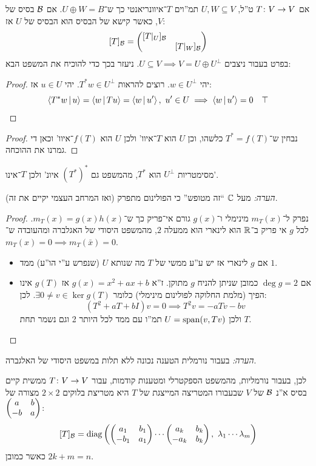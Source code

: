 \documentclass[]{../../../../tex/classes/styledArticle}
\begin{document}
	אם $T \colon V \to V$ ט''ל, $U, W \subseteq V$ תמ''וים $T$־איוונריאנטי כך ש־$U \oplus W = B$. אם $\mathcal{B}$ בסיס של $V$, כאשר קישא של הבסיס הוא הבסיס של $U$ אז: 
	\[ [T]_{\mathcal{B}} = \begin{pmatrix} [T|_U]_{\mathcal{B}} &  \\  & [T|_W]_{\mathcal{B}} \end{pmatrix} \]
	בפרט בעבור ניצבים $U \subseteq V \implies V = U \oplus U^{\perp}$. ניעזר בכך כדי להוכיח את המשפט הבא: 
	\begin{proof}
		יהי $w \in U^{\perp}$. רוצים להראות $T^*w \in U^{\perp}$. יהי $u \in U$ אז: 
		\[ \left \langle T^* w \,\middle|\, u \right \rangle = \left \langle w \,\middle|\, Tu \right \rangle = \left \langle w \,\middle|\, u' \right \rangle, \ u' \in U \implies \left \langle w \,\middle|\, u' \right \rangle = 0 \quad \top \]
	\end{proof}
	\begin{proof}
		נבחין ש־$T^* = f(T)$ כלשהו, וכן $U$ הוא $T$־איוו' ולכן $U$ הוא $f(T)$־איוו' וכאן די גמרנו את ההוכחה. 
	\end{proof}
	מסימטריות $U^{\perp}$ הוא $T^*$, מהמשפט גם $(T^*)^*$ איונ' ולכן $T$־אינו'. 
	
	\textit{הערה: }מעל $\mathbb{C}$ ``זה מטופש'' כי הפולינום מתפרק (ואז המרחב העצמי יקיים את זה). 
	\begin{proof}
		נפרק ל־$m_T(x)$ מינימלי ו־$g(x)$ גורם אי־פריק כך ש־$m_T(x) = g(x)h(x)$. לכל $g$ אי פריק ב־$\mathbb{R}$ הוא לינארי  הוא ממעלה $2$, מהמשפט היסודי של האגלברה ומהעובדה ש־$m_T(x) = 0 \implies m_T(\bar x) = 0$. 
		\begin{itemize}
			\item אם $g$ לינארי אז יש ע''ע ממשי של $T$ מה שנותא $U$ (שנפרש ע''י הו''ע) ממד $1$. 
			\item אם $\deg g = 2$ כמובן שניתן להניח $g$ מתוקן. ז''א $g(x) = x^2 + ax + b$ אז $g(T)$ אינו הפיך (מלמת החלוקה לפולינום מינימלי) כלומר $\exists 0 \neq v \in \ker g(T)$. 
			לכן: 
			\[ (T^2 + aT + bI)v = 0 \implies T^2v = -a T v - bv \]
			ולכן $U = \operatorname{span}(v, Tv)$ תמ''ו עם ממד לכל היותר 2 וגם נשמר תחת $T$. 
		\end{itemize}
	\end{proof}
	
	\textit{הערה: }בעבור נורמלית הטענה נכונה ללא תלות במשפט היסודי של האלגברה. 
	
	לכן, בעבור נורמליות, מהמשפט הספקטרלי ומטענות קודמות, עבור $T \colon V \to V$ ממשית קיים בסיס א''נ $\mathcal{B}$ של $V$ שבעבורו המטריצה המייצגת של $T$ היא מטריצת בלוקים $2 \times 2$ מצורה של $\begin{pmatrix} a & b \\ -b & a \end{pmatrix}$: 
	\[ [T]_{\mathcal{B}} = \operatorname{diag}\left ( \begin{pmatrix} a_1 & b_1 \\ -b_1 & a_1 \end{pmatrix} \cdots \begin{pmatrix} a_k & b_k \\ -a_k & b_k \end{pmatrix}, \ \lambda_1 \cdots \lambda_m \right ) \]
	כאשר כמובן $2k + m = n$. 
	
\end{document}
